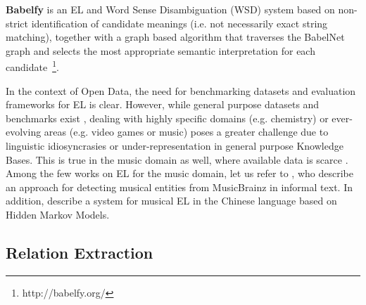 \vspace{-0.2cm}
\noindent \textbf{Babelfy} \citep{Moroetal2014b} is an EL and Word Sense Disambiguation (WSD) system based on non-strict identification of candidate meanings (i.e. not necessarily exact string matching), together with a graph based algorithm that traverses the BabelNet graph and selects the most appropriate semantic interpretation for each candidate~\footnote{http://babelfy.org/}.

In the context of Open Data, the need for benchmarking datasets and evaluation frameworks for EL is clear. However, while general purpose datasets and benchmarks exist \citep{Usbeck2015}, dealing with highly specific domains (e.g. chemistry) or ever-evolving areas (e.g. video games or music) poses a greater challenge due to linguistic idiosyncrasies or under-representation in general purpose Knowledge Bases. This is true in the music domain as well, where available data is scarce \citep{Gruhl2009}.
Among the few works on EL for the music domain, let us refer to \citep{Gruhl2009}, who describe an approach for detecting musical entities from MusicBrainz in informal text. In addition, \citep{Zhang2009} describe a system for musical EL in the Chinese language based on Hidden Markov Models. %



\subsection{Relation Extraction}
\label{sec:SOA:nlu:relation_extraction}

